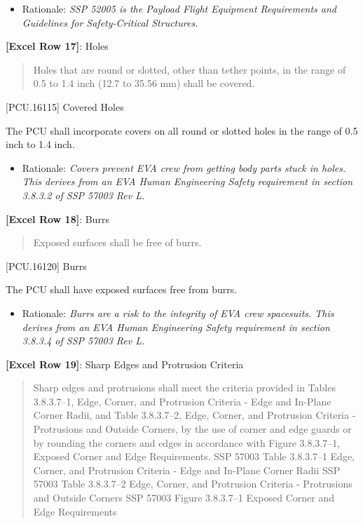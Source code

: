 \begin{itemize}
\item{} Rationale: \emph{SSP 52005 is the Payload Flight Equipment Requirements and Guidelines for Safety-Critical Structures.}

\end{itemize}

\textbf{[Excel Row 17]}: Holes

\begin{quote}
Holes that are round or slotted, other than tether points, in the range of 0.5 to 1.4 inch (12.7 to 35.56 mm) shall be covered.
\end{quote}

[PCU.16115] Covered Holes

The PCU shall incorporate covers on all round or slotted holes in the range of 0.5 inch to 1.4 inch.

\begin{itemize}
\item{} Rationale: \emph{Covers prevent EVA crew from getting body parts stuck in holes. This derives from an EVA Human Engineering Safety requirement in section 3.8.3.2 of SSP 57003 Rev L.}

\end{itemize}

\textbf{[Excel Row 18]}: Burrs

\begin{quote}
Exposed surfaces shall be free of burrs.
\end{quote}

[PCU.16120] Burrs

The PCU shall have exposed surfaces free from burrs.

\begin{itemize}
\item{} Rationale: \emph{Burrs are a risk to the integrity of EVA crew spacesuits. This derives from an EVA Human Engineering Safety requirement in section 3.8.3.4 of SSP 57003 Rev L.}

\end{itemize}

\textbf{[Excel Row 19]}: Sharp Edges and Protrusion Criteria

\begin{quote}
Sharp edges and protrusions shall meet the criteria provided in Tables 3.8.3.7--1, Edge, Corner, and Protrusion Criteria - Edge and In-Plane Corner Radii, and Table 3.8.3.7--2, Edge, Corner, and Protrusion Criteria - Protrusions and Outside Corners, by the use of corner and edge guards or by rounding the corners and edges in accordance with Figure 3.8.3.7--1, Exposed Corner and Edge Requirements.
SSP 57003 Table 3.8.3.7--1 Edge, Corner, and Protrusion Criteria - Edge and In-Plane Corner Radii
SSP 57003 Table 3.8.3.7--2 Edge, Corner, and Protrusion Criteria - Protrusions and Outside Corners
SSP 57003 Figure 3.8.3.7--1 Exposed Corner and Edge Requirements
\end{quote}

